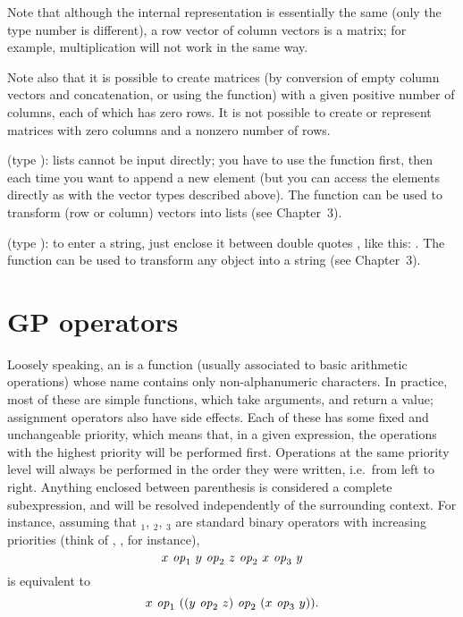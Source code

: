 Note that although the internal representation is essentially the same (only
the type number is different), a row vector of column vectors is 
a matrix; for example, multiplication will not work in the same way.

Note also that it is possible to create matrices (by conversion of empty
column vectors and concatenation, or using the  function) with a
given positive number of columns, each of which has zero rows. It is not
possible to create or represent matrices with zero columns and a nonzero
number of rows.

 (type ): lists cannot be input
directly; you have to use the function  first, then
 each time you want to append a new element (but you can
access the elements directly as with the vector types described above). The
function  can be used to transform (row or column) vectors into
lists (see Chapter~3).

 (type ):
to enter a string, just enclose it between double quotes , like
this: . The function  can be used to
transform any object into a string (see Chapter~3).

\section{GP operators}\label{se:operators}

\noindent
Loosely speaking, an  is a function (usually associated to
basic arithmetic operations) whose name contains only non-alphanumeric
characters. In practice, most of these are simple functions, which take
arguments, and return a value; assignment operators also have side effects.
Each of these has some fixed and unchangeable priority, which means that,
in a given expression, the operations with the highest priority will be
performed first. Operations at the same priority level will always be
performed in the order they were written, i.e.~from left to right. Anything
enclosed between parenthesis is considered a complete subexpression, and
will be resolved independently of the surrounding context. For instance,
assuming that $_1$, $_2$, $_3$ are standard binary
operators with increasing priorities (think of \kbd{+}, \kbd{*}, \kbd{\pow}
for instance),
$$ x~\hbox{\it op\/}_1~y~\hbox{\it op\/}_2~z~\hbox{\it op\/}_2~x~\hbox{\it op\/}_3~y $$
is equivalent to
$$ x~\hbox{\it op\/}_1~((y~\hbox{\it op\/}_2~z)~\hbox{\it op\/}_2~ (x~\hbox{\it op\/}_3~y)).$$

